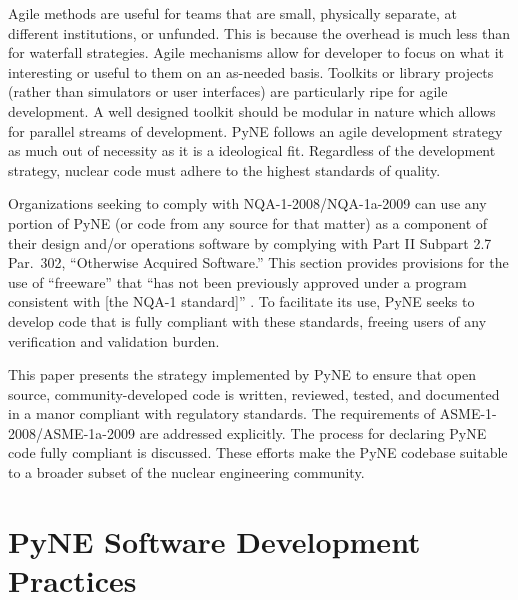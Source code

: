 \documentclass{anstrans}
\begin{document}
Agile methods are useful for teams that are small, physically separate, at
different institutions, or unfunded. This is because the overhead is much 
less than for waterfall strategies.  Agile mechanisms allow for developer
to focus on what it interesting or useful to them on an as-needed basis.
Toolkits or library projects (rather than simulators or user interfaces) are 
particularly ripe for agile development. A well designed toolkit should be 
modular in nature which allows for parallel streams of development.  
PyNE follows an agile development strategy as much out of necessity as it
is a ideological fit.  Regardless of the development strategy, nuclear code
must adhere to the highest standards of quality.

Organizations seeking to comply with NQA-1-2008/NQA-1a-2009 can use any portion
of PyNE (or code from any source for that matter) as a component of their
design and/or operations software by complying with Part II Subpart 2.7 Par.\
302, ``Otherwise Acquired Software.'' This section provides provisions for the
use of ``freeware'' that ``has not been previously approved under a program
consistent with [the NQA-1 standard]'' \cite{add}.  To facilitate its use, PyNE
seeks to develop code that is fully compliant with these standards, freeing users of
any verification and validation burden.

This paper presents the strategy implemented by PyNE to ensure that
open source, community-developed code is written, reviewed, tested, and
documented in a manor compliant with regulatory standards. The requirements of
ASME-1-2008/ASME-1a-2009 are addressed explicitly. The process for declaring
PyNE code fully compliant is discussed. These efforts make the PyNE codebase suitable
to a broader subset of the nuclear engineering community.

\section{PyNE Software Development Practices}
\end{document}
